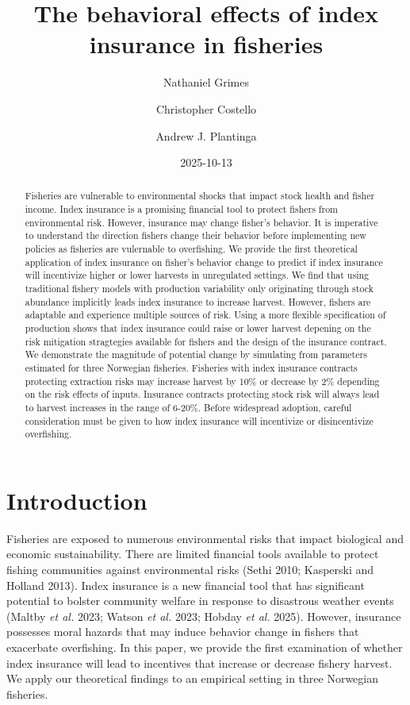 \documentclass[
  letterpaper,
  DIV=11,
  numbers=noendperiod]{scrartcl}
\title{The behavioral effects of index insurance in fisheries}
\author{Nathaniel Grimes \and Christopher Costello \and Andrew J.
Plantinga}
\date{2025-10-13}
\renewcommand*\contentsname{Table of contents}
\newcommand\contentsname{Table of contents}
\theoremstyle{plain}
\theoremstyle{plain}
\theoremstyle{remark}
\begin{document}
\maketitle
\begin{abstract}
Fisheries are vulnerable to environmental shocks that impact stock
health and fisher income. Index insurance is a promising financial tool
to protect fishers from environmental risk. However, insurance may
change fisher's behavior. It is imperative to understand the direction
fishers change their behavior before implementing new policies as
fisheries are vulernable to overfishing. We provide the first
theoretical application of index insurance on fisher's behavior change
to predict if index insurance will incentivize higher or lower harvests
in unregulated settings. We find that using traditional fishery models
with production variability only originating through stock abundance
implicitly leads index insurance to increase harvest. However, fishers
are adaptable and experience multiple sources of risk. Using a more
flexible specification of production shows that index insurance could
raise or lower harvest depening on the risk mitigation stragtegies
available for fishers and the design of the insurance contract. We
demonstrate the magnitude of potential change by simulating from
parameters estimated for three Norwegian fisheries. Fisheries with index
insurance contracts protecting extraction risks may increase harvest by
10\% or decrease by 2\% depending on the risk effects of inputs.
Insurance contracts protecting stock risk will always lead to harvest
increases in the range of 6-20\%. Before widespread adoption, careful
consideration must be given to how index insurance will incentivize or
disincentivize overfishing.
\end{abstract}

\renewcommand*\contentsname{Table of contents}
{
\hypersetup{linkcolor=}
\setcounter{tocdepth}{3}
\tableofcontents
}

\section{Introduction}\label{introduction}

Fisheries are exposed to numerous environmental risks that impact
biological and economic sustainability. There are limited financial
tools available to protect fishing communities against environmental
risks (Sethi 2010; Kasperski and Holland 2013). Index insurance is a new
financial tool that has significant potential to bolster community
welfare in response to disastrous weather events (Maltby \emph{et al.}
2023; Watson \emph{et al.} 2023; Hobday \emph{et al.} 2025). However,
insurance possesses moral hazards that may induce behavior change in
fishers that exacerbate overfishing. In this paper, we provide the first
examination of whether index insurance will lead to incentives that
increase or decrease fishery harvest. We apply our theoretical findings
to an empirical setting in three Norwegian fisheries.
\end{document}

